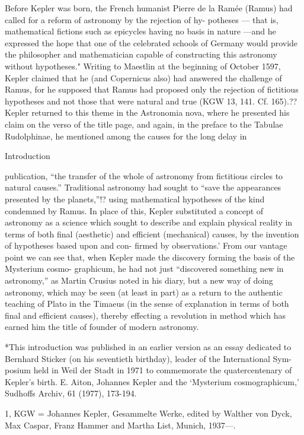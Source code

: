 \documentclass{article}
\begin{document}
Before Kepler was born, the French humanist Pierre de la Ramée
(Ramus) had called for a reform of astronomy by the rejection of hy-
potheses — that is, mathematical fictions such as epicycles having no basis
in nature —and he expressed the hope that one of the celebrated schools of
Germany would provide the philosopher and mathematician capable of
constructing this astronomy without hypotheses." Writing to Maestlin at
the beginning of October 1597, Kepler claimed that he (and Copernicus
also) had answered the challenge of Ramus, for he supposed that Ramus
had proposed only the rejection of fictitious hypotheses and not those
that were natural and true (KGW 13, 141. Cf. 165).?? Kepler returned to
this theme in the Astronomia nova, where he presented his claim on the
verso of the title page, and again, in the preface to the Tabulae
Rudolphinae, he mentioned among the causes for the long delay in

Introduction

publication, “the transfer of the whole of astronomy from fictitious
circles to natural causes.” Traditional astronomy had sought to “save the
appearances presented by the planets,”!? using mathematical hypotheses
of the kind condemned by Ramus. In place of this, Kepler substituted a
concept of astronomy as a science which sought to describe and explain
physical reality in terms of both final (aesthetic) and efficient
(mechanical) causes, by the invention of hypotheses based upon and con-
firmed by observations.’ From our vantage point we can see that, when
Kepler made the discovery forming the basis of the Mysterium cosmo-
graphicum, he had not just “discovered something new in astronomy,” as
Martin Crusius noted in his diary, but a new way of doing astronomy,
which may be seen (at least in part) as a return to the authentic teaching of
Plato in the Timaeus (in the sense of explanation in terms of both final
and efficient causes), thereby effecting a revolution in method which has
earned him the title of founder of modern astronomy.


*This introduction was published in an earlier version as an essay dedicated to
Bernhard Sticker (on his seventieth birthday), leader of the International Sym-
posium held in Weil der Stadt in 1971 to commemorate the quatercentenary of
Kepler’s birth. E. Aiton, Johannes Kepler and the ‘Mysterium cosmographicum,’
Sudhoffs Archiv, 61 (1977), 173-194.

1, KGW = Johannes Kepler, Gesammelte Werke, edited by Walther von Dyck,
Max Caspar, Franz Hammer and Martha List, Munich, 1937—.
\end{document}
